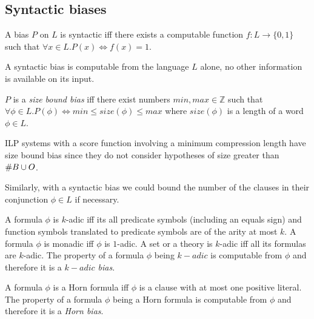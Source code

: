 \subsection{Syntactic biases}

\begin{defn}
A bias $P$ on $L$ is syntactic iff there exists a computable function $f:L \to \{0,1\}$ such that $\forall x \in L.P(x) \iff f(x)=1$.
\end{defn}

\begin{remark}
A syntactic bias is computable from the language $L$ alone, no other information is available on its input.
\end{remark}

\begin{defn}
$P$ is a \emph{size bound bias} iff there exist numbers $min, max \in \mathbb{Z}$ such that $\forall \phi \in L. P(\phi) \iff min \le size(\phi) \le max$ where $size(\phi)$ is a length of a word $\phi \in L$.
\end{defn}

\begin{remark}
ILP systems with a score function involving a minimum compression length have size bound bias since they do not consider hypotheses of size greater than $\#B \cup O$.
\end{remark}

\begin{remark}
Similarly, with a syntactic bias we could bound the number of the clauses in their conjunction $\phi \in L$ if necessary.
\end{remark}

\begin{defn}
A formula $\phi$ is $k$-adic iff its all predicate symbols (including an equals sign) and function symbols translated to predicate symbols are of the arity at most $k$. A formula $\phi$ is monadic iff $\phi$ is $1$-adic. A set or a theory is $k$-adic iff all its formulas are $k$-adic. The property of a formula $\phi$ being $k-adic$ is computable from $\phi$ and therefore it is a \emph{$k-adic$ bias}.
\end{defn}

\begin{defn}
A formula $\phi$ is a Horn formula iff $\phi$ is a clause with at most one positive literal. The property of a formula $\phi$ being a Horn formula is computable from $\phi$ and therefore it is a \emph{Horn bias}.
\end{defn}


